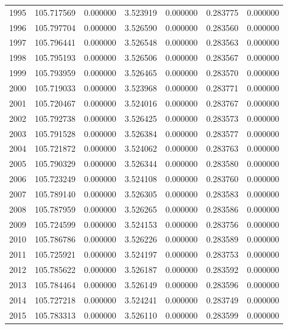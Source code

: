 \begin{tabular}{rrrrrrr}
1995 & 105.717569 &    0.000000 &  3.523919 &   0.000000 &   0.283775 &  0.000000 \\
1996 & 105.797704 &    0.000000 &  3.526590 &   0.000000 &   0.283560 &  0.000000 \\
1997 & 105.796441 &    0.000000 &  3.526548 &   0.000000 &   0.283563 &  0.000000 \\
1998 & 105.795193 &    0.000000 &  3.526506 &   0.000000 &   0.283567 &  0.000000 \\
1999 & 105.793959 &    0.000000 &  3.526465 &   0.000000 &   0.283570 &  0.000000 \\
2000 & 105.719033 &    0.000000 &  3.523968 &   0.000000 &   0.283771 &  0.000000 \\
2001 & 105.720467 &    0.000000 &  3.524016 &   0.000000 &   0.283767 &  0.000000 \\
2002 & 105.792738 &    0.000000 &  3.526425 &   0.000000 &   0.283573 &  0.000000 \\
2003 & 105.791528 &    0.000000 &  3.526384 &   0.000000 &   0.283577 &  0.000000 \\
2004 & 105.721872 &    0.000000 &  3.524062 &   0.000000 &   0.283763 &  0.000000 \\
2005 & 105.790329 &    0.000000 &  3.526344 &   0.000000 &   0.283580 &  0.000000 \\
2006 & 105.723249 &    0.000000 &  3.524108 &   0.000000 &   0.283760 &  0.000000 \\
2007 & 105.789140 &    0.000000 &  3.526305 &   0.000000 &   0.283583 &  0.000000 \\
2008 & 105.787959 &    0.000000 &  3.526265 &   0.000000 &   0.283586 &  0.000000 \\
2009 & 105.724599 &    0.000000 &  3.524153 &   0.000000 &   0.283756 &  0.000000 \\
2010 & 105.786786 &    0.000000 &  3.526226 &   0.000000 &   0.283589 &  0.000000 \\
2011 & 105.725921 &    0.000000 &  3.524197 &   0.000000 &   0.283753 &  0.000000 \\
2012 & 105.785622 &    0.000000 &  3.526187 &   0.000000 &   0.283592 &  0.000000 \\
2013 & 105.784464 &    0.000000 &  3.526149 &   0.000000 &   0.283596 &  0.000000 \\
2014 & 105.727218 &    0.000000 &  3.524241 &   0.000000 &   0.283749 &  0.000000 \\
2015 & 105.783313 &    0.000000 &  3.526110 &   0.000000 &   0.283599 &  0.000000 \\

\end{tabular}
